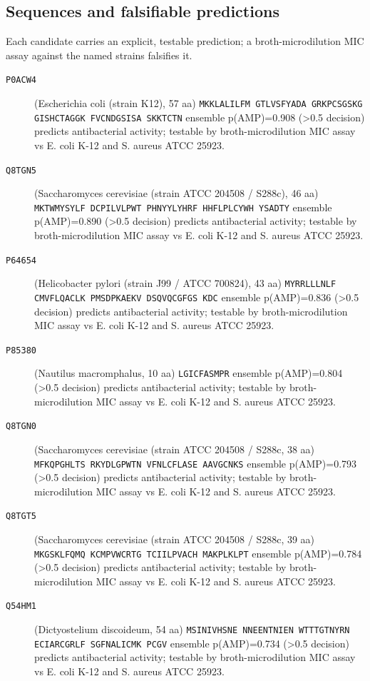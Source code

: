 \subsection*{Sequences and falsifiable predictions}
Each candidate carries an explicit, testable prediction; a
broth-microdilution MIC assay against the named strains falsifies it.
\begin{description}
\item[\texttt{P0ACW4}] (Escherichia coli (strain K12), 57 aa) \texttt{MKKLALILFM GTLVSFYADA GRKPCSGSKG GISHCTAGGK FVCNDGSISA SKKTCTN}
  ensemble p(AMP)=0.908 (>0.5 decision) predicts antibacterial activity; testable by broth-microdilution MIC assay vs E. coli K-12 and S. aureus ATCC 25923.
\item[\texttt{Q8TGN5}] (Saccharomyces cerevisiae (strain ATCC 204508 / S288c), 46 aa) \texttt{MKTWMYSYLF DCPILVLPWT PHNYYLYHRF HHFLPLCYWH YSADTY}
  ensemble p(AMP)=0.890 (>0.5 decision) predicts antibacterial activity; testable by broth-microdilution MIC assay vs E. coli K-12 and S. aureus ATCC 25923.
\item[\texttt{P64654}] (Helicobacter pylori (strain J99 / ATCC 700824), 43 aa) \texttt{MYRRLLLNLF CMVFLQACLK PMSDPKAEKV DSQVQCGFGS KDC}
  ensemble p(AMP)=0.836 (>0.5 decision) predicts antibacterial activity; testable by broth-microdilution MIC assay vs E. coli K-12 and S. aureus ATCC 25923.
\item[\texttt{P85380}] (Nautilus macromphalus, 10 aa) \texttt{LGICFASMPR}
  ensemble p(AMP)=0.804 (>0.5 decision) predicts antibacterial activity; testable by broth-microdilution MIC assay vs E. coli K-12 and S. aureus ATCC 25923.
\item[\texttt{Q8TGN0}] (Saccharomyces cerevisiae (strain ATCC 204508 / S288c, 38 aa) \texttt{MFKQPGHLTS RKYDLGPWTN VFNLCFLASE AAVGCNKS}
  ensemble p(AMP)=0.793 (>0.5 decision) predicts antibacterial activity; testable by broth-microdilution MIC assay vs E. coli K-12 and S. aureus ATCC 25923.
\item[\texttt{Q8TGT5}] (Saccharomyces cerevisiae (strain ATCC 204508 / S288c, 39 aa) \texttt{MKGSKLFQMQ KCMPVWCRTG TCIILPVACH MAKPLKLPT}
  ensemble p(AMP)=0.784 (>0.5 decision) predicts antibacterial activity; testable by broth-microdilution MIC assay vs E. coli K-12 and S. aureus ATCC 25923.
\item[\texttt{Q54HM1}] (Dictyostelium discoideum, 54 aa) \texttt{MSINIVHSNE NNEENTNIEN WTTTGTNYRN ECIARCGRLF SGFNALICMK PCGV}
  ensemble p(AMP)=0.734 (>0.5 decision) predicts antibacterial activity; testable by broth-microdilution MIC assay vs E. coli K-12 and S. aureus ATCC 25923.

\end{description}
